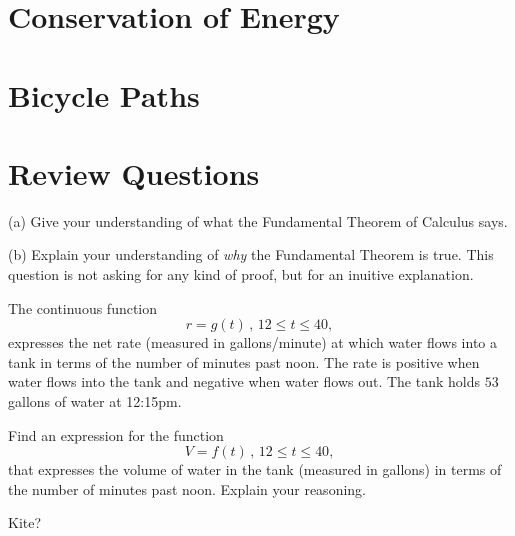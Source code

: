 \documentclass{ximera}
\begin{document}
\section*{Conservation of Energy}


\section*{Bicycle Paths}




\section*{Review Questions}

\begin{question}  \label{Qdfdsftt5466544}
(a) Give your understanding of what the Fundamental Theorem of Calculus says.

(b) Explain your understanding of \emph{why} the Fundamental Theorem is true. This question is not asking for any kind of proof, but for an inuitive explanation.
\end{question}


\begin{question}  \label{Q45rfdg55}
The continuous function
\[
  r = g(t) \, ,  \, 12 \leq t \leq 40,
\]
expresses the net rate (measured in gallons/minute) at which water flows into a tank in terms of the number of minutes past noon. The rate is positive when water flows into the tank and negative when water flows out. The tank holds $53$ gallons of water at 12:15pm.

Find an expression for the function
\[
    V = f(t)\, ,  \, 12 \leq t \leq 40,
\]
that expresses the volume of water in the tank (measured in gallons) in terms of the number of minutes past noon. Explain your reasoning.

\end{question}

\begin{question}  \label{Q5434g54t5t}
Kite?

\end{question}
\end{document}
